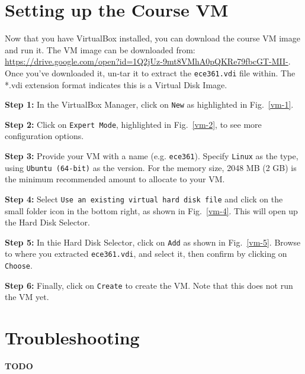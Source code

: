 \documentclass[11pt]{article}
\begin{document}
\section{Setting up the Course VM}
\label{sec:setup-vm}
Now that you have VirtualBox installed, you can download the course VM image and run it. The VM image can be downloaded from: \url{https://drive.google.com/open?id=1Q2jUz-9mt8VMhA0pQKRe79fbcGT-MII-}. Once you've downloaded it, un-tar it to extract the \texttt{ece361.vdi} file within. The *.vdi extension format indicates this is a Virtual Disk Image.

\textbf{Step 1:} In the VirtualBox Manager, click on \texttt{New} as highlighted in Fig.~\ref{vm-1}.

\textbf{Step 2:} Click on \texttt{Expert Mode}, highlighted in Fig.~\ref{vm-2}, to see more configuration options.

\textbf{Step 3:} Provide your VM with a name (e.g. \texttt{ece361}). Specify \texttt{Linux} as the type, using \texttt{Ubuntu (64-bit)} as the version. For the memory size, 2048 MB (2 GB) is the minimum recommended amount to allocate to your VM. 

\textbf{Step 4:} Select \texttt{Use an existing virtual hard disk file} and click on the small folder icon in the bottom right, as shown in Fig.~\ref{vm-4}. This will open up the Hard Disk Selector.

\textbf{Step 5:} In thie Hard Disk Selector, click on \texttt{Add} as shown in Fig.~\ref{vm-5}. Browse to where you extracted \texttt{ece361.vdi}, and select it, then confirm by clicking on \texttt{Choose}.

\textbf{Step 6:} Finally, click on \texttt{Create} to create the VM. Note that this does not run the VM yet.


\section{Troubleshooting}
\label{sec:troubleshooting}
\textbf{TODO}
\end{document}
